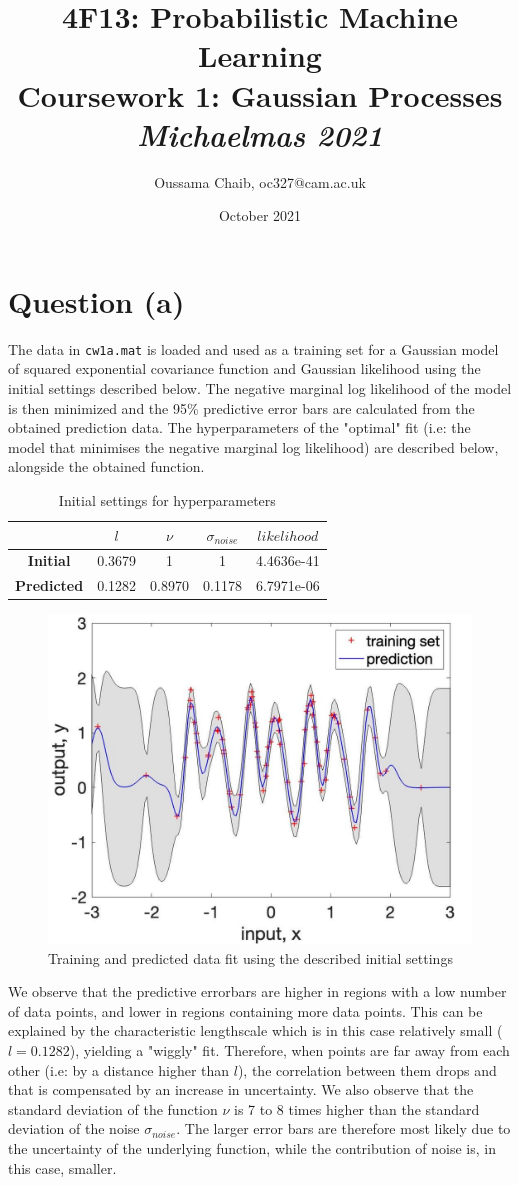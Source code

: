 \documentclass[a4paper,11pt]{article}
\title{%
	\textbf{4F13: Probabilistic Machine Learning} \\
	\vspace{5pt}
	\large Coursework 1: Gaussian Processes \\

	\vspace{10pt}
	\small \textit{Michaelmas 2021}}
\author{\small Oussama Chaib, oc327@cam.ac.uk}
\date{\small October 2021}
\begin{document}
	\setlength\parindent{0pt}
	\maketitle
	\section*{Question (a)}
	\noindent
	The data in \texttt{cw1a.mat} is loaded and used as a training set for a Gaussian model of squared exponential covariance function and Gaussian likelihood using the initial settings described below.
	The negative marginal log likelihood of the model is then minimized and the 95\% predictive error bars are calculated from the obtained prediction data. The hyperparameters of the "optimal" fit (i.e: the model that minimises the negative marginal log likelihood) are described below, alongside the obtained function.
	\begin{table}[H]
	\centering
	\begin{tabular}{| c  | c | c | c | c |}
		\hline
		& \textbf{$l$} & $\nu$ & \textbf{$\sigma_{noise}$} & $likelihood$ \\
		\hline \hline
		\textbf{Initial} & 0.3679 & 1 & 1 & 4.4636e-41\\
		\hline
		\textbf{Predicted} & 0.1282 & 0.8970 & 0.1178 & 6.7971e-06\\
		\hline
	\end{tabular}
	\caption{Initial settings for hyperparameters}
\end{table}
\begin{figure}[H]
	\centering
	\includegraphics[width=.7\linewidth]{figures/a1.jpg}
	\caption{Training and predicted data fit using the described initial settings}
	\label{fig:1}
\end{figure}
\noindent
We observe that the predictive errorbars are higher in regions with a low number of data points, and lower in regions containing more data points. This can be explained by the characteristic lengthscale which is in this case relatively small ($l = 0.1282$), yielding a "wiggly" fit. Therefore, when points are far away from each other (i.e: by a distance higher than $l$), the correlation between them drops and that is compensated by an increase in uncertainty. We also observe that the standard deviation of the function $\nu$ is 7 to 8 times higher than the standard deviation of the noise $\sigma_{noise}$. The larger error bars are therefore most likely due to the uncertainty of the underlying function, while the contribution of noise is, in this case, smaller.
\end{document}
